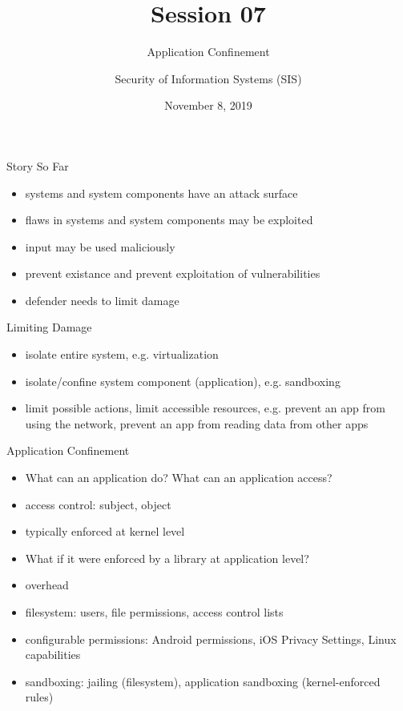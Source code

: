 \documentclass{curs}
\title[Session 07]{Session 07}
\subtitle{Application Confinement}
\author{Security of Information Systems (SIS)}
\date{November 8, 2019}
\begin{document}
\frame{\titlepage}

\begin{frame}{Story So Far}
  \begin{itemize}
    \pause \item systems and system components have an attack surface
    \pause \item flaws in systems and system components may be exploited
    \pause \item input may be used maliciously
    \pause \item prevent existance and prevent exploitation of vulnerabilities
    \pause \item defender needs to limit damage
  \end{itemize}
\end{frame}

\begin{frame}{Limiting Damage}
  \begin{itemize}
    \pause \item isolate entire system, e.g. virtualization
    \pause \item isolate/confine system component (application), e.g. sandboxing
    \pause \item limit possible actions, limit accessible resources, e.g. prevent an app from using the network, prevent an app from reading data from other apps
  \end{itemize}
\end{frame}

\begin{frame}{Application Confinement}
  \begin{itemize}
    \pause \item What can an application do? What can an application access?
    \pause \item access control: subject, object
    \pause \item typically enforced at kernel level
    \pause \item What if it were enforced by a library at application level?
    \pause \item overhead
    \pause \item filesystem: users, file permissions, access control lists
    \pause \item configurable permissions: Android permissions, iOS Privacy Settings, Linux capabilities
    \pause \item sandboxing: jailing (filesystem), application sandboxing (kernel-enforced rules)
  \end{itemize}
\end{frame}
\end{document}
